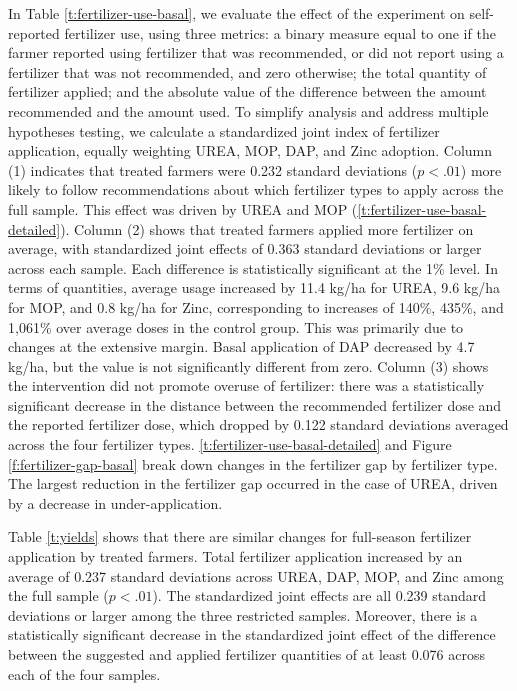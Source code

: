 \documentclass{article}
\begin{document}
In Table \ref{t:fertilizer-use-basal}, we evaluate the effect of the experiment on self-reported fertilizer use, using three metrics:  a binary measure equal to one if the farmer reported using fertilizer that was recommended, or did not report using a fertilizer that was not recommended, and zero otherwise; the total quantity of fertilizer applied; and the absolute value of the difference between the amount recommended and the amount used. To simplify analysis and address multiple hypotheses testing, we calculate a standardized joint index of fertilizer application, equally weighting UREA, MOP, DAP, and Zinc adoption. Column (1) indicates that treated farmers were 0.232 standard deviations ($p<.01$) more likely to follow recommendations about which fertilizer types to apply across the full sample. This effect was driven by UREA and MOP (\ref{t:fertilizer-use-basal-detailed}). Column (2) shows that treated farmers applied more fertilizer on average, with standardized joint effects of 0.363 standard deviations or larger across each sample. Each difference is statistically significant at the 1\% level. In terms of quantities, average usage increased by 11.4 kg/ha for UREA, 9.6 kg/ha for MOP, and 0.8 kg/ha for Zinc, corresponding to increases of 140\%, 435\%, and 1,061\% over average doses in the control group. This was primarily due to changes at the extensive margin. Basal application of DAP decreased by 4.7 kg/ha, but the value is not significantly different from zero. Column (3) shows the intervention did not promote overuse of fertilizer: there was a statistically significant decrease in the distance between the recommended fertilizer dose and the reported fertilizer dose, which dropped by 0.122 standard deviations averaged across the four fertilizer types. \ref{t:fertilizer-use-basal-detailed} and Figure \ref{f:fertilizer-gap-basal} break down changes in the fertilizer gap by fertilizer type. The largest reduction in the fertilizer gap occurred in the case of UREA, driven by a decrease in under-application. 

Table \ref{t:yields} shows that there are similar changes for full-season fertilizer application by treated farmers. Total fertilizer application increased by an average of 0.237 standard deviations across UREA, DAP, MOP, and Zinc among the full sample ($p < .01$). The standardized joint effects are all 0.239 standard deviations or larger among the three restricted samples. Moreover, there is a statistically significant decrease in the standardized joint effect of the difference between the suggested and applied fertilizer quantities of at least 0.076 across each of the four samples. 
\end{document}
